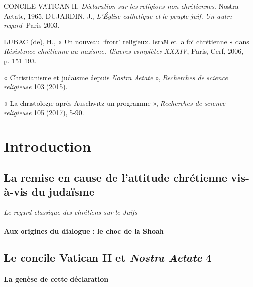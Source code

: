 CONCILE VATICAN II, \emph{Déclaration sur les religions
non-chrétiennes}. Nostra Aetate, 1965. DUJARDIN, J., \emph{L'Église
catholique et le peuple juif. Un autre regard}, Paris 2003.

LUBAC (de), H., « Un nouveau `front' religieux. Israël et la foi
chrétienne » dans \emph{Résistance chrétienne au nazisme. Œuvres
complètes XXXIV}, Paris, Cerf, 2006, p. 151-193.

« Christianisme et judaïsme depuis \emph{Nostra Aetate} »,
\emph{Recherches de science religieuse} 103 (2015).

« La christologie après Auschwitz un programme », \emph{Recherches de
science religieuse} 105 (2017), 5-90.


\hypertarget{introduction}{%
\section{Introduction}\label{introduction}}




  
  \subsection{La remise en cause de l'attitude chrétienne vis-à-vis du
  judaïsme}
  

  
  
  
    
    \emph{Le regard classique des chrétiens sur le Juifs}
    
  
    
    \paragraph{Aux origines du dialogue : le choc de la Shoah}
    
  

  
  \subsection{Le concile Vatican II et \emph{Nostra Aetate} 4}
  

  
  \def\labelenumii{\arabic{enumii}.}
  
    
    \paragraph{La genèse de cette déclaration}
    
